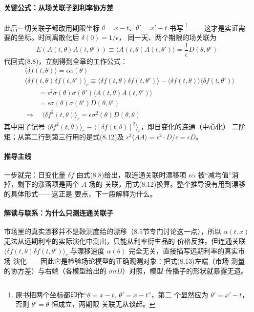 \paragraph{关键公式：从场关联子到利率协方差}
此后一切关联子都改用期限坐标 $\theta=x-t$、$\theta'=x'-t$ 书写
\footnote{原书把两个坐标都印作“$\theta=x-t,\ \theta'=x-t$”，第二
个显然应为 $\theta'=x'-t$，否则 $\theta'=\theta$ 恒成立，两期限
关联无从谈起。}
——这才是实证需要的坐标。时间离散化后 $\delta(0)=1/\epsilon$，
同一天、两个期限的场关联为
\begin{equation*}
E(A(t,\theta)A(t,\theta'))\equiv\langle A(t,\theta)A(t,\theta')\rangle
=\frac{1}{\epsilon}D(\theta,\theta')
\tag{8.12}
\end{equation*}
代回式(8.8)，立刻得到全章的工作公式：
\begin{align*}
&\langle\delta f(t,\theta)\rangle=\epsilon\alpha(\theta)\\
&\langle\delta f(t,\theta)\delta f(t,\theta')\rangle_c\equiv
\langle\delta f(t,\theta)\delta f(t,\theta')\rangle
-\langle\delta f(t,\theta)\rangle\langle\delta f(t,\theta')\rangle\\
&\qquad=\epsilon^{2}\sigma(\theta)\sigma(\theta')
\langle A(t,\theta)A(t,\theta')\rangle\\
&\qquad=\epsilon\sigma(\theta)\sigma(\theta')D(\theta,\theta')
\tag{8.13}\\
&\Rightarrow\quad\langle\delta f^{2}(t,\theta)\rangle_c
=\epsilon\sigma^{2}(\theta)D(\theta,\theta)
\tag{8.14}
\end{align*}
其中用了记号 $\langle\delta f^{2}(t,\theta)\rangle_c\equiv
\langle[\delta f(t,\theta)]^{2}\rangle_c$，即日变化的连通（中心化）
二阶矩；从第二行到第三行用的是式(8.12)及
$\epsilon^{2}\langle AA\rangle=\epsilon^{2}\cdot D/\epsilon=\epsilon D$。

\paragraph{推导主线}
一步就完：日变化量 $\delta f$ 由式(8.8)给出，取连通关联时漂移项
$\epsilon\alpha$ 被“减均值”消掉，剩下的涨落项是两个 $A$ 场的
关联，用式(8.12)换算。整个推导没有用到漂移的具体形式——这正是
要点，下一段解释为什么。

\paragraph{解读与联系：为什么只测连通关联子}
市场里的真实漂移并不是鞅测度给的漂移（8.5节专门讨论这一点），所以
$\alpha(t,x)$ 无法从远期利率的实际演化中测出，只能从利率衍生品的
价格反推。但连通关联 $\langle\delta f(t,\theta)\delta f(t,\theta')\rangle_c$
与漂移速度 $\alpha(\theta)$ 完全无关，直接描写远期利率的真实市场
演化——因此它是检验场论模型的正确观测对象：把式(8.13)左端（市场
测量的协方差）与右端（各模型给出的 $\sigma\sigma D$）对照，模型
传播子的形状就暴露无遗。

